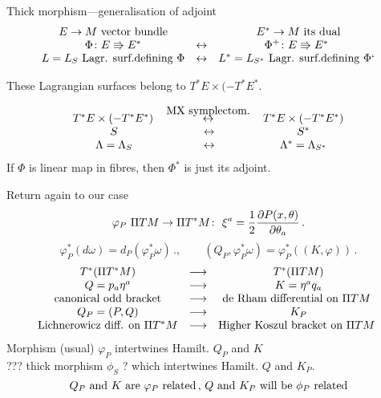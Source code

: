 \documentclass{beamer}
\def\w {{\omega}}
\def\p{\partial}
\def\L {{\Lambda}}
\def\p {\partial}
\begin{document}
\begin{frame}{Thick morphism---generalisation of adjoint}
              $$
  \begin{matrix}
  \hbox{$E\to M$ vector bundle} && \hbox{ $E^*\to M$ its dual}\cr
\Phi\colon E\Rrightarrow E^* &\leftrightarrow& 
\Phi^+\colon E\Rrightarrow E^*\cr
 \hbox{$L=L_S$ Lagr. surf.defining $\Phi$}
      &\leftrightarrow&    
 \hbox{$L^*=L_{S^*}$ Lagr. surf.defining $\Phi$}`
     \end{matrix}
          $$
\centerline{
These Lagrangian surfaces belong to $T^*E\times (-T^*E^*$.}  
 $$
  \begin{matrix}
   T^*E\times (-T^*E^*)
       \,& {\buildrel 
  \hbox{MX symplectom.}\over \leftrightarrow}\,& 
   T^*E\times (-T^*E^*)\cr
      S &\leftrightarrow&  S^*\cr
      \L=\L_S &\leftrightarrow& \L^*=\L_{S^*}\cr
     \end{matrix}
          $$
If  $\Phi$ is linear map in fibres, then $\Phi^*$ is just its adjoint.
\end{frame}
\begin{frame}{Return again to our case}
         $$
      \varphi_P\,\,\Pi TM\to\Pi T^*M\colon\,\,
 \xi^a={1\over 2}{\p P(x,\theta)\over \p \theta_a}\,.
         $$
         $$
     \varphi_P^*(d\w)=d_P(\varphi_P^*\w)\,.,\qquad
(Q_P,\varphi_P^*\w)=\varphi_P^*\left((K,\varphi)\right)\,.
         $$
        $$
       \begin{matrix}
    T^*(\Pi T^*M) &\longrightarrow & T^*(\Pi TM)\cr
             Q=p_a\eta^a& \longrightarrow &  K=\eta^aq_a\cr
        \hbox{canonical odd bracket} &\longrightarrow&
         \hbox{de Rham differential on $\Pi TM$ }\cr
     Q_P=(P,Q)& \longrightarrow &  K_P\cr
        \hbox{Lichnerowicz diff. on $\Pi T^*M$} &\longrightarrow&
         \hbox{Higher Koszul bracket on $\Pi TM$ }\cr 
       \end{matrix}
        $$
         $$
         $$
Morphism (usual) $\varphi_P$ intertwines 
Hamilt. $Q_P$ and $K$\\

??? thick morphism $\phi_S$ ?
which intertwines Hamilt. $Q$ and $K_P$.
        $$
  \hbox{$Q_P$ and $K$ are $\varphi_P$ related}\,,\,
  \hbox{$Q$ and $K_P$ will be  $\phi_P$ related}
        $$




\end{frame}
\end{document}
